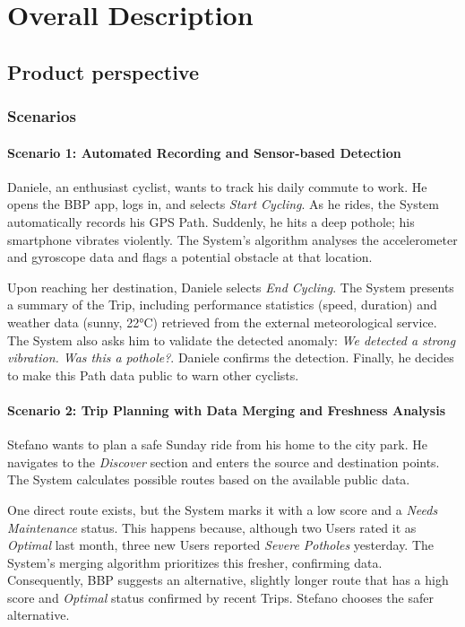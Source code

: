 \chapter{Overall Description}

\section{Product perspective}

\subsection{Scenarios}

\subsubsection*{Scenario 1: Automated Recording and Sensor-based Detection}
Daniele, an enthusiast cyclist, wants to track his daily commute to work. He opens the BBP app, logs in, and selects \emph{Start Cycling}. As he rides, the System automatically records his GPS Path. Suddenly, he hits a deep pothole; his smartphone vibrates violently. The System's algorithm analyses the accelerometer and gyroscope data and flags a potential obstacle at that location.

Upon reaching her destination, Daniele selects \emph{End Cycling}. The System presents a summary of the Trip, including performance statistics (speed, duration) and weather data (sunny, 22°C) retrieved from the external meteorological service. The System also asks him to validate the detected anomaly: \emph{We detected a strong vibration. Was this a pothole?}. Daniele confirms the detection. Finally, he decides to make this Path data public to warn other cyclists.

\subsubsection*{Scenario 2: Trip Planning with Data Merging and Freshness Analysis}
Stefano wants to plan a safe Sunday ride from his home to the city park. He navigates to the \emph{Discover} section and enters the source and destination points. The System calculates possible routes based on the available public data.

One direct route exists, but the System marks it with a low score and a \emph{Needs Maintenance} status. This happens because, although two Users rated it as \emph{Optimal} last month, three new Users reported \emph{Severe Potholes} yesterday. The System's merging algorithm prioritizes this fresher, confirming data. Consequently, BBP suggests an alternative, slightly longer route that has a high score and \emph{Optimal} status confirmed by recent Trips. Stefano chooses the safer alternative.

